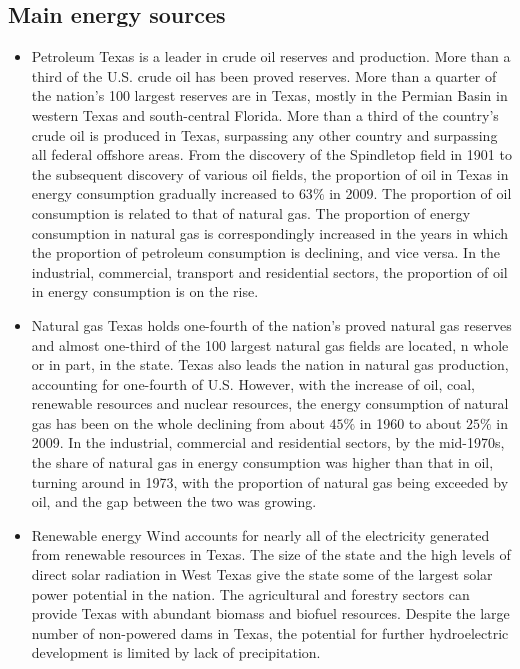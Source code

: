 \documentclass{mcmthesis}
\begin{document}
\subsection{Main energy sources}
\begin{itemize}
  \item Petroleum
  Texas is a leader in crude oil reserves and production. More than a third of the U.S. crude oil has been proved reserves.
  More than a quarter of the nation's 100 largest reserves are in Texas, mostly in the Permian Basin in western Texas and south-central Florida.
  More than a third of the country's crude oil is produced in Texas, surpassing any other country and surpassing all federal offshore areas.
  From the discovery of the Spindletop field in 1901 to the subsequent discovery of various oil fields, the proportion of oil in Texas
  in energy consumption gradually increased to $63\%$ in 2009. The proportion of oil consumption is related to that of natural gas.
  The proportion of energy consumption in natural gas is correspondingly increased in the years in which the proportion of petroleum consumption
  is declining, and vice versa. In the industrial, commercial, transport and residential sectors, the proportion of oil in energy consumption is on the rise.
  \item Natural gas
  Texas holds one-fourth of the nation's proved natural gas reserves and almost one-third of the 100 largest natural gas fields are located,
  n whole or in part, in the state. Texas also leads the nation in natural gas production, accounting for one-fourth of U.S. However,
  with the increase of oil, coal, renewable resources and nuclear resources, the energy consumption of natural gas has been on the
  whole declining from about $45\%$ in 1960 to about $25\%$ in 2009. In the industrial, commercial and residential sectors,
  by the mid-1970s, the share of natural gas in energy consumption was higher than that in oil, turning around in 1973,
  with the proportion of natural gas being exceeded by oil, and the gap between the two was growing.
  \item Renewable energy
  Wind accounts for nearly all of the electricity generated from renewable resources in Texas. The size of the state and
  the high levels of direct solar radiation in West Texas give the state some of the largest solar power potential in the nation.
  The agricultural and forestry sectors can provide Texas with abundant biomass and biofuel resources.
  Despite the large number of non-powered dams in Texas, the potential for further hydroelectric development is limited by lack of precipitation.

\end{itemize}
\end{document}
